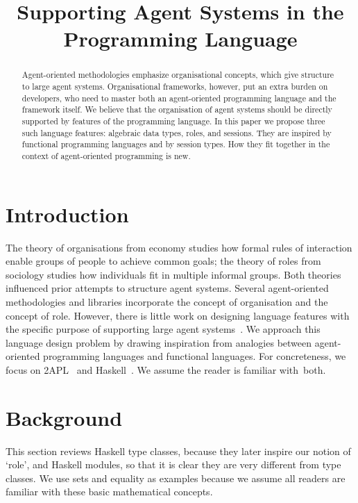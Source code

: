 \documentclass[conference,compsoc]{IEEEtran} %
\title{Supporting Agent Systems in the Programming Language}
\author{
  \IEEEauthorblockN{Claudia Grigore and Rem Collier} 
  \IEEEauthorblockA{
    School of Computer Science and Informatics\\
    University College Dublin\\
    Belfield Campus, Dublin~4, Ireland\\
    Email: claudia.grigore@ucdconnect.ie, rem.collier@ucd.ie}}
\begin{document}
\maketitle
\begin{abstract} %

Agent-oriented methodologies emphasize organisational concepts, which give
structure to large agent systems. Organisational frameworks, however, put
an extra burden on developers, who need to master both an agent-oriented
programming language and the framework itself. We believe that the
organisation of agent systems should be directly supported by features of
the programming language. In this paper we propose three such language
features: algebraic data types, roles, and sessions.  They are inspired by
functional programming languages and by session types.  How they fit
together in the context of agent-oriented programming is new.

\end{abstract} %
\section{Introduction} %

The theory of organisations from economy studies how formal rules of
interaction enable groups of people to achieve common goals; the theory of
roles from sociology studies how individuals fit in multiple informal
groups. Both theories influenced prior attempts to structure agent systems.
Several agent-oriented methodologies and libraries incorporate the concept
of organisation and the concept of role.  However, there is little work on
designing language features with the specific purpose of supporting large
agent systems~\cite{collier2005,DBLP:journals/entcs/BaldoniBT06}. We
approach this language design problem by drawing inspiration from analogies
between agent-oriented programming languages and functional languages. For
concreteness, we focus on 2APL~\cite{DBLP:journals/aamas/Dastani08} and
Haskell~\cite{web:haskell}.  We assume the reader is familiar with~both.

\section{Background} %

This section reviews Haskell type classes, because they later inspire our
notion of `role', and Haskell modules, so that it is clear they are very
different from type classes. We use sets and equality as examples because
we assume all readers are familiar with these basic mathematical concepts.
\end{document}
